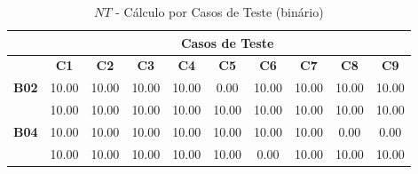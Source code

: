 \begin{table}[htbp]
	\centering
	\caption{$NT$ - Cálculo por Casos de Teste (binário)}
	\begin{tabular}{c|ccccccccc|}
		\cline{2-10}
		\rowcolor[HTML]{D0CECE} 
		\cellcolor[HTML]{F2F2F2}\textbf{} & \multicolumn{9}{c|}{\cellcolor[HTML]{D0CECE}\textbf{Casos de Teste}} \\ \hline
		\rowcolor[HTML]{D9D9D9} 
		\multicolumn{1}{|c|}{\cellcolor[HTML]{D0CECE}\textbf{Participante}} & \multicolumn{1}{c|}{\cellcolor[HTML]{D9D9D9}\textbf{C1}} & \multicolumn{1}{c|}{\cellcolor[HTML]{D9D9D9}\textbf{C2}} & \multicolumn{1}{c|}{\cellcolor[HTML]{D9D9D9}\textbf{C3}} & \multicolumn{1}{c|}{\cellcolor[HTML]{D9D9D9}\textbf{C4}} & \multicolumn{1}{c|}{\cellcolor[HTML]{D9D9D9}\textbf{C5}} & \multicolumn{1}{c|}{\cellcolor[HTML]{D9D9D9}\textbf{C6}} & \multicolumn{1}{c|}{\cellcolor[HTML]{D9D9D9}\textbf{C7}} & \multicolumn{1}{c|}{\cellcolor[HTML]{D9D9D9}\textbf{C8}} & \textbf{C9} \\ \hline
		\multicolumn{1}{|c|}{\textbf{B02}} & \multicolumn{1}{c|}{10.00} & \multicolumn{1}{c|}{10.00} & \multicolumn{1}{c|}{10.00} & \multicolumn{1}{c|}{10.00} & \multicolumn{1}{c|}{0.00} & \multicolumn{1}{c|}{10.00} & \multicolumn{1}{c|}{10.00} & \multicolumn{1}{c|}{10.00} & 10.00 \\ \hline
		\rowcolor[HTML]{F2F2F2} 
		\multicolumn{1}{|c|}{\cellcolor[HTML]{F2F2F2}\textbf{B03}} & \multicolumn{1}{c|}{\cellcolor[HTML]{F2F2F2}10.00} & \multicolumn{1}{c|}{\cellcolor[HTML]{F2F2F2}10.00} & \multicolumn{1}{c|}{\cellcolor[HTML]{F2F2F2}10.00} & \multicolumn{1}{c|}{\cellcolor[HTML]{F2F2F2}10.00} & \multicolumn{1}{c|}{\cellcolor[HTML]{F2F2F2}10.00} & \multicolumn{1}{c|}{\cellcolor[HTML]{F2F2F2}10.00} & \multicolumn{1}{c|}{\cellcolor[HTML]{F2F2F2}10.00} & \multicolumn{1}{c|}{\cellcolor[HTML]{F2F2F2}10.00} & 10.00 \\ \hline
		\multicolumn{1}{|c|}{\textbf{B04}} & \multicolumn{1}{c|}{10.00} & \multicolumn{1}{c|}{10.00} & \multicolumn{1}{c|}{10.00} & \multicolumn{1}{c|}{10.00} & \multicolumn{1}{c|}{10.00} & \multicolumn{1}{c|}{10.00} & \multicolumn{1}{c|}{10.00} & \multicolumn{1}{c|}{0.00} & 0.00 \\ \hline
		\rowcolor[HTML]{F2F2F2} 
		\multicolumn{1}{|c|}{\cellcolor[HTML]{F2F2F2}\textbf{B05}} & \multicolumn{1}{c|}{\cellcolor[HTML]{F2F2F2}10.00} & \multicolumn{1}{c|}{\cellcolor[HTML]{F2F2F2}10.00} & \multicolumn{1}{c|}{\cellcolor[HTML]{F2F2F2}10.00} & \multicolumn{1}{c|}{\cellcolor[HTML]{F2F2F2}10.00} & \multicolumn{1}{c|}{\cellcolor[HTML]{F2F2F2}10.00} & \multicolumn{1}{c|}{\cellcolor[HTML]{F2F2F2}0.00} & \multicolumn{1}{c|}{\cellcolor[HTML]{F2F2F2}10.00} & \multicolumn{1}{c|}{\cellcolor[HTML]{F2F2F2}10.00} & 10.00 \\ \hline

\end{tabular}
\end{table}
